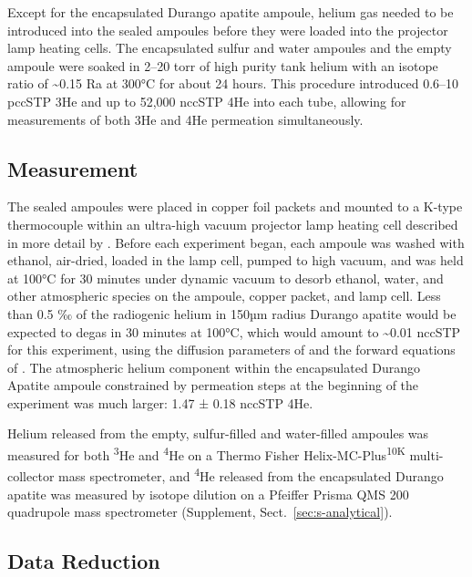 Except for the encapsulated Durango apatite ampoule, helium gas needed to be introduced into the sealed ampoules before they were loaded into the projector lamp heating cells. The encapsulated sulfur and water ampoules and the empty ampoule were soaked in 2--20 torr of high purity tank helium with an isotope ratio of \textasciitilde0.15 Ra at 300°C for about 24 hours. This procedure introduced 0.6--10 pccSTP 3He and up to 52,000 nccSTP 4He into each tube, allowing for measurements of both 3He and 4He permeation simultaneously. 

\subsection{Measurement}\label{sec:measurement}

The sealed ampoules were placed in copper foil packets and mounted to a K-type thermocouple within an ultra-high vacuum projector lamp heating cell described in more detail by \citet{farley1999}. Before each experiment began, each ampoule was washed with ethanol, air-dried, loaded in the lamp cell, pumped to high vacuum, and was held at 100°C for 30 minutes under dynamic vacuum to desorb ethanol, water, and other atmospheric species on the ampoule, copper packet, and lamp cell. Less than 0.5 ‰ of the radiogenic helium in 150µm radius Durango apatite would be expected to degas in 30 minutes at 100°C, which would amount to \textasciitilde0.01 nccSTP for this experiment, using the diffusion parameters of \citet{farley2000} and the forward equations of \citet{fechtigkalbitzer1966}. The atmospheric helium component within the encapsulated Durango Apatite ampoule constrained by permeation steps at the beginning of the experiment was much larger: 1.47 ± 0.18 nccSTP 4He.

Helium released from the empty, sulfur-filled and water-filled ampoules was measured for both \textsuperscript{3}He and \textsuperscript{4}He on a Thermo Fisher Helix-MC-Plus\textsuperscript{10K} multi-collector mass spectrometer, and \textsuperscript{4}He released from the encapsulated Durango apatite was measured by isotope dilution on a Pfeiffer Prisma QMS 200 quadrupole mass spectrometer (Supplement, Sect.~\ref{sec:s-analytical}). 

\subsection{Data Reduction}\label{analytical-methods}

